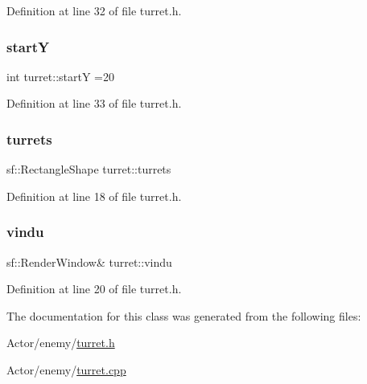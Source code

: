 Definition at line 32 of file turret.\+h.

\hypertarget{classturret_a1c6f133716195eb48d8e9a9b0f65bae2}{}\label{classturret_a1c6f133716195eb48d8e9a9b0f65bae2} 
\subsubsection{\texorpdfstring{startY}{startY}}
{\footnotesize\ttfamily int turret\+::startY =20}



Definition at line 33 of file turret.\+h.

\hypertarget{classturret_a0c205e4ea097f7dc2b0da90196e75d3c}{}\label{classturret_a0c205e4ea097f7dc2b0da90196e75d3c} 
\subsubsection{\texorpdfstring{turrets}{turrets}}
{\footnotesize\ttfamily sf\+::\+Rectangle\+Shape turret\+::turrets}



Definition at line 18 of file turret.\+h.

\hypertarget{classturret_a226e3153f72a293f9f62e1e1dea16739}{}\label{classturret_a226e3153f72a293f9f62e1e1dea16739} 
\subsubsection{\texorpdfstring{vindu}{vindu}}
{\footnotesize\ttfamily sf\+::\+Render\+Window\& turret\+::vindu}



Definition at line 20 of file turret.\+h.



The documentation for this class was generated from the following files\+:\begin{DoxyCompactItemize}
\item 
Actor/enemy/\hyperlink{turret_8h}{turret.\+h}\item 
Actor/enemy/\hyperlink{turret_8cpp}{turret.\+cpp}\end{DoxyCompactItemize}

